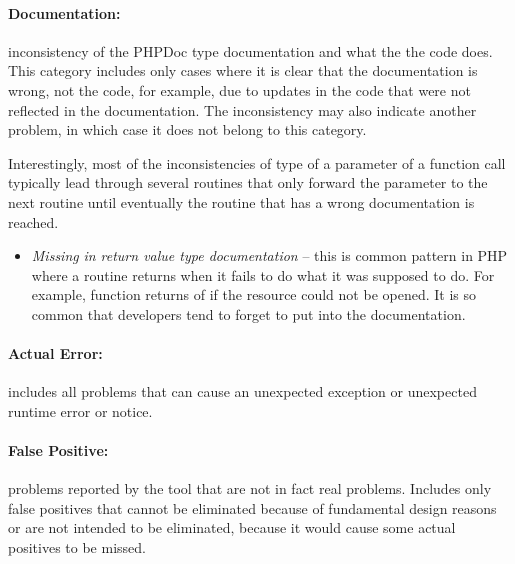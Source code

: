 \paragraph*{Documentation:} inconsistency of the PHPDoc type 
documentation and what the the code does. This category includes 
only cases where it is clear that the documentation is wrong, not the code, 
for example, due to updates in the code that were not reflected 
in the documentation. The inconsistency may also indicate 
another problem, in which case it does not belong to this category. 

Interestingly, most of the inconsistencies of type of a parameter 
of a function call typically lead through several routines that 
only forward the parameter to the next routine until 
eventually the routine that has a wrong documentation is reached.

\begin{itemize}
    \item[] \textit{Missing}  \textit{in return value type documentation} -- 
        this is common pattern in PHP where a routine returns  
        when it fails to do what it was supposed to do. For example, 
        function  returns  of  
        if the resource could not be opened. It is so common that 
        developers tend to forget to put  into the documentation.
\end{itemize}

\paragraph*{Actual Error:} includes all problems that can cause 
an unexpected exception or unexpected runtime error or notice.


\paragraph*{False Positive:} problems reported by the tool that 
are not in fact real problems. Includes only false positives 
that cannot be eliminated because of fundamental design reasons 
or are not intended to be eliminated, because it would 
cause some actual positives to be missed.


